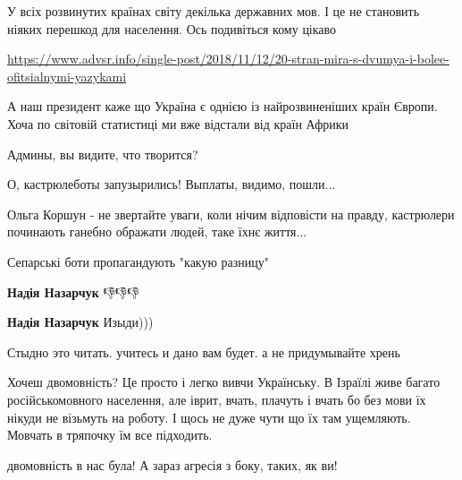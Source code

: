 \begin{itemize}
У всіх розвинутих країнах світу декілька державних мов. І це не становить ніяких перешкод для населення. 
Ось подивіться кому цікаво 

\url{https://www.advsr.info/single-post/2018/11/12/20-stran-mira-s-dvumya-i-bolee-ofitsialnymi-yazykami}

А наш президент каже що Україна є однією із найрозвиненіших країн Європи. Хоча
по світовій статистиці ми вже відстали від країн Африки


Админы, вы видите, что творится?

О, кастрюлеботы запузырились! Выплаты, видимо, пошли...

Ольга Коршун - не звертайте уваги, коли нічим відповісти на правду, кастрюлери починають ганебно ображати людей, таке їхнє життя...

Сепарські боти пропагандують "какую разницу"

\begin{itemize}
\textbf{Надія Назарчук} 👎👎👎

\textbf{Надія Назарчук} Изыди)))
\end{itemize}


Стыдно это читать. учитесь и дано вам будет. а не придумывайте хрень



Хочеш двомовність? Це просто і легко вивчи Українську. В Ізраїлі живе багато
російськомовного населення, але іврит, вчать, плачуть і вчать бо без мови їх
нікуди не візьмуть на роботу. І щось не дуже чути що їх там ущемляють. Мовчать
в тряпочку їм все підходить.

\begin{itemize}
двомовність в нас була! А зараз агресія з боку, таких, як ви!


\end{itemize}
\end{itemize}
